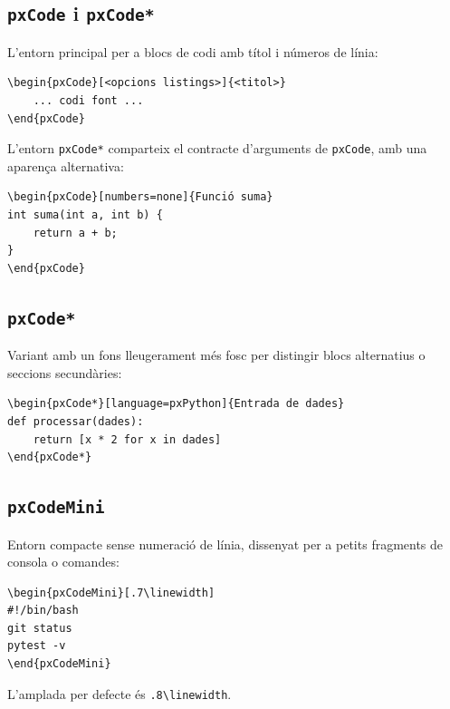 \documentclass[11pt,a4paper]{article}
\begin{document}
\subsection{\texttt{pxCode} i \texttt{pxCode*}}

L'entorn principal per a blocs de codi amb t\'itol i n\'umeros de l\'inia:

\begin{verbatim}
\begin{pxCode}[<opcions listings>]{<titol>}
    ... codi font ...
\end{pxCode}
\end{verbatim}

L'entorn \texttt{pxCode*} comparteix el contracte d'arguments de \texttt{pxCode}, amb una aparen\c{c}a alternativa:

\begin{verbatim}
\begin{pxCode}[numbers=none]{Funció suma}
int suma(int a, int b) {
    return a + b;
}
\end{pxCode}
\end{verbatim}

\subsection{\texttt{pxCode*}}

Variant amb un fons lleugerament m\'es fosc per distingir blocs alternatius o seccions secund\`aries:

\begin{verbatim}
\begin{pxCode*}[language=pxPython]{Entrada de dades}
def processar(dades):
    return [x * 2 for x in dades]
\end{pxCode*}
\end{verbatim}

\subsection{\texttt{pxCodeMini}}

Entorn compacte sense numeraci\'o de l\'inia, dissenyat per a petits fragments de consola o comandes:

\begin{verbatim}
\begin{pxCodeMini}[.7\linewidth]
#!/bin/bash
git status
pytest -v
\end{pxCodeMini}
\end{verbatim}

L'amplada per defecte \'es \texttt{.8\textbackslash linewidth}.
\end{document}
